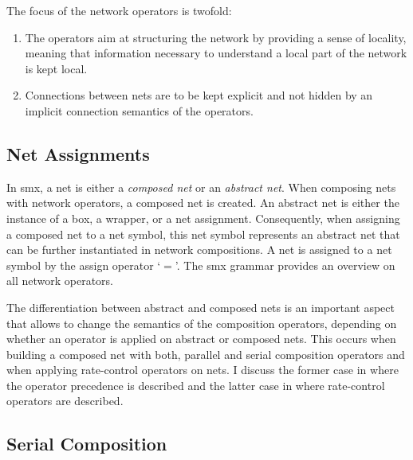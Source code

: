 The focus of the network operators is twofold:
\begin{enumerate}
    \item The operators aim at structuring the network by providing a sense of locality, meaning that information necessary to understand a local part of the network is kept local.
    \item Connections between nets are to be kept explicit and not hidden by an implicit connection semantics of the operators.
\end{enumerate}

\subsection{Net Assignments}
\label{sect_smx_network_assign}
In \gls*{smx}, a net is either a \emph{composed net} or an \emph{abstract net}.
When composing nets with network operators, a composed net is created.
An abstract net is either the instance of a box, a wrapper, or a net assignment.
Consequently, when assigning a composed net to a net symbol, this net symbol represents an abstract net that can be further instantiated in network compositions.
A net is assigned to a net symbol by the assign operator `$=$'.
The \gls*{smx} grammar provides an overview on all network operators.



The differentiation between abstract and composed nets is an important aspect that allows to change the semantics of the composition operators, depending on whether an operator is applied on abstract or composed nets.
This occurs when building a composed net with both, parallel and serial composition operators and when applying rate-control operators on nets.
I discuss the former case in \Sect{\ref{sect_smx_network_precedence}} where the operator precedence is described and the latter case in \Sect{\ref{sect_smx_network_time}} where rate-control operators are described.

\subsection{Serial Composition}
\label{sect_smx_network_serial}

